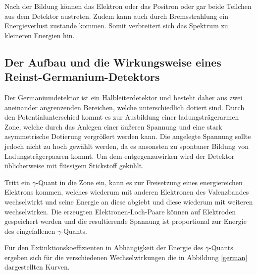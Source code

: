 Nach der Bildung können das Elektron oder das Positron oder gar beide Teilchen aus dem Detektor austreten.
Zudem kann auch durch Bremsstrahlung ein Energieverlust zustande kommen.
Somit verbreitert sich das Spektrum zu kleineren Energien hin.
\FloatBarrier
\subsection{Der Aufbau und die Wirkungsweise eines Reinst-Germanium-Detektors} %
\label{sec:der_aufbau_und_die_wirkungsweise_eines_reinst_germanium_detektors}

Der Germaniumdetektor ist ein Halbleiterdetektor und besteht daher aus zwei aneinander angrenzenden Bereichen, welche unterschiedlich dotiert sind.
Durch den Potentialunterschied kommt es zur Ausbildung einer ladungsträgerarmen Zone, welche durch das Anlegen einer äußeren Spannung und eine stark asymmetrische Dotierung vergrößert werden kann.
Die angelegte Spannung sollte jedoch nicht zu hoch gewählt werden, da es ansonsten zu spontaner Bildung von Ladungsträgerpaaren kommt.
Um dem entgegenzuwirken wird der Detektor üblicherweise mit flüssigem Stickstoff gekühlt.

Tritt ein $\gamma$-Quant in die Zone ein, kann es zur Freisetzung eines energiereichen Elektrons kommen, welches wiederum mit anderen Elektronen des Valenzbandes wechselwirkt und seine Energie an diese abgiebt und diese wiederum mit weiteren wechselwirken.
Die erzeugten Elektronen-Loch-Paare können auf Elektroden gespeichert werden und die resultierende Spannung ist proportional zur Energie des eingefallenen $\gamma$-Quants.

Für den Extinktionskoeffizienten in Abhängigkeit der Energie des $\gamma$-Quants ergeben sich für die verschiedenen Wechselwirkungen die in Abbildung \ref{german} dargestellten Kurven.\\

